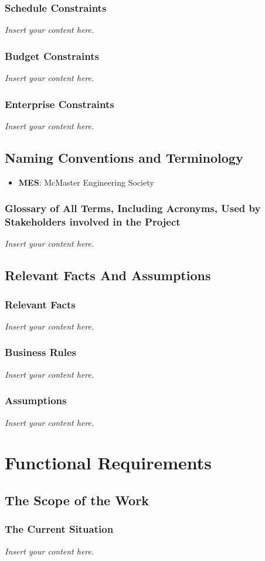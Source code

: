\documentclass[12pt]{article}
\newcommand{\lips}{\textit{Insert your content here.}}
\begin{document}
\subsubsection{Schedule Constraints}
\lips
\subsubsection{Budget Constraints}
\lips
\subsubsection{Enterprise Constraints}
\lips

\subsection{Naming Conventions and Terminology}
\begin{itemize}
  \item \textbf{MES}: McMaster Engineering Society
\end{itemize}
\subsubsection{Glossary of All Terms, Including Acronyms, Used by Stakeholders
involved in the Project}
\lips

\subsection{Relevant Facts And Assumptions}
\subsubsection{Relevant Facts}
\lips
\subsubsection{Business Rules}
\lips
\subsubsection{Assumptions}
\lips

\section{Functional Requirements}
\subsection{The Scope of the Work}
\subsubsection{The Current Situation}
\lips
\end{document}
